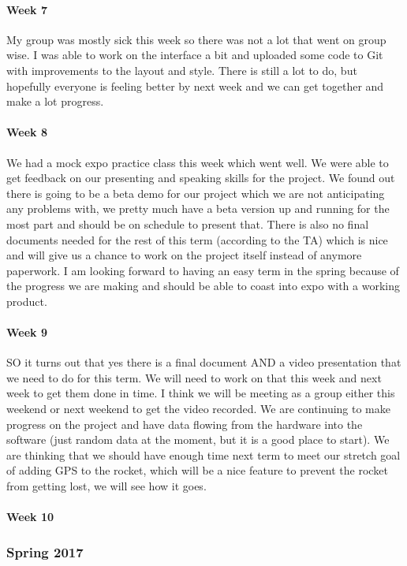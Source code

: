 \documentclass[10pt,draftclsnofoot,onecolumn,retainorgcmds]{IEEEtran}
\begin{document}
\paragraph{Week 7}
 My group was mostly sick this week so there was not a lot that went on group wise. I was able to work on the interface a bit and uploaded some code to Git with improvements to the layout and style. There is still a lot to do, but hopefully everyone is feeling better by next week and we can get together and make a lot progress.\\
\paragraph{Week 8}
We had a mock expo practice class this week which went well. We were able to get feedback on our presenting and speaking skills for the project. We found out there is going to be a beta demo for our project which we are not anticipating any problems with, we pretty much have a beta version up and running for the most part and should be on schedule to present that. There is also no final documents needed for the rest of this term (according to the TA) which is nice and will give us a chance to work on the project itself instead of anymore paperwork. I am looking forward to having an easy term in the spring because of the progress we are making and should be able to coast into expo with a working product. \
\paragraph{Week 9}
SO it turns out that yes there is a final document AND a video presentation that we need to do for this term. We will need to work on that this week and next week to get them done in time. I think we will be meeting as a group either this weekend or next weekend to get the video recorded. We are continuing to make progress on the project and have data flowing from the hardware into the software (just random data at the moment, but it is a good place to start). We are thinking that we should have enough time next term to meet our stretch goal of adding GPS to the rocket, which will be a nice feature to prevent the rocket from getting lost, we will see how it goes. \\
\paragraph{Week 10}
\subsubsection{Spring 2017}
\end{document}
